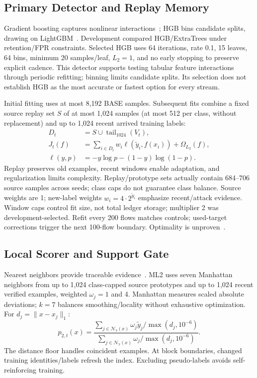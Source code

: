 \documentclass[conference]{IEEEtran}
\begin{document}
\subsection{Primary Detector and Replay Memory}
Gradient boosting captures nonlinear interactions~\cite{friedman}; HGB bins candidate splits, drawing on LightGBM~\cite{lightgbm,sklearn}. Development compared HGB/ExtraTrees under retention/FPR constraints. Selected HGB uses 64 iterations, rate 0.1, 15 leaves, 64 bins, minimum 20 samples/leaf, $L_2=1$, and no early stopping to preserve explicit cadence. This detector supports testing tabular feature interactions through periodic refitting; binning limits candidate splits. Its selection does not establish HGB as the most accurate or fastest option for every stream.

Initial fitting uses at most 8,192 BASE samples. Subsequent fits combine a fixed source replay set $S$ of at most 1,024 samples (at most 512 per class, without replacement) and up to 1,024 recent arrived training labels:
\begin{align}
 D_t&=S\cup\operatorname{tail}_{1024}(V_t),\nonumber\\
 J_t(f)&=\sum_{i\in D_t}w_i\ell(\tilde y_i,f(x_i))+\Omega_{L_2}(f),\label{eq:loss}\\
 \ell(y,p)&=-y\log p-(1-y)\log(1-p).\nonumber
\end{align}
Replay preserves old examples, recent windows enable adaptation, and regularization limits complexity. Replay/prototype sets actually contain 684--706 source samples across seeds; class caps do not guarantee class balance. Source weights are 1; new-label weights $w_i=4\cdot2^{\tilde y_i}$ emphasize recent/attack evidence. Window caps control fit size, not total ledger storage; multiplier 2 was development-selected. Refit every 200 flows matches controls; used-target corrections trigger the next 100-flow boundary. Optimality is unproven~\cite{adwin,arf}.

\subsection{Local Scorer and Support Gate}
Nearest neighbors provide traceable evidence~\cite{cover,dudani}. ML2 uses seven Manhattan neighbors from up to 1,024 class-capped source prototypes and up to 1,024 recent verified examples, weighted $\omega_j=1$ and 4. Manhattan measures scaled absolute deviations; $k=7$ balances smoothing/locality without exhaustive optimization. For $d_j=\|x-x_j\|_1$:
\begin{equation}
 p_{2,t}(x)=\frac{\sum_{j\in\mathcal N_7(x)}\omega_j\tilde y_j/\max(d_j,10^{-6})}{\sum_{j\in\mathcal N_7(x)}\omega_j/\max(d_j,10^{-6})}.\label{eq:knn}
\end{equation}
The distance floor handles coincident examples. At block boundaries, changed training identities/labels refresh the index. Excluding pseudo-labels avoids self-reinforcing training.
\end{document}
